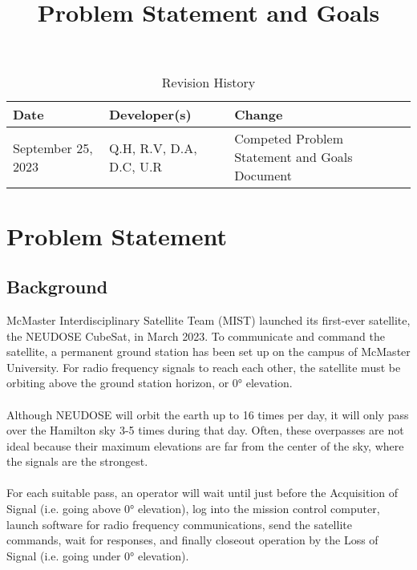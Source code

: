 \documentclass{article}
\title{Problem Statement and Goals\\\progname}
\author{\authname}
\date{}
\begin{document}
\maketitle

\begin{table}[hp]
\caption{Revision History} \label{TblRevisionHistory}
\begin{tabularx}{\textwidth}{llX}
\toprule
\textbf{Date} & \textbf{Developer(s)} & \textbf{Change}\\
\midrule
September 25, 2023 & Q.H, R.V, D.A, D.C, U.R & Competed Problem Statement and Goals Document\\
\bottomrule
\end{tabularx}
\end{table}

\section{Problem Statement}

\subsection{Background}
McMaster Interdisciplinary Satellite Team (MIST) launched its first-ever satellite, the NEUDOSE
CubeSat, in March 2023. To communicate and command the satellite, a permanent ground station has been set up on the campus of McMaster University. For radio frequency signals to reach each other, the satellite must be orbiting above the ground station horizon, or 0° elevation. 
\\ \\
Although NEUDOSE will orbit the earth up to 16 times per day, it will only pass over the Hamilton sky 3-5 times during that day. Often, these overpasses are not ideal because their maximum elevations are far from the center of the sky, where the signals are the strongest.
\\ \\ 
For each suitable pass, an operator will wait until just before the Acquisition of Signal (i.e. going above 0° elevation), log into the mission control computer, launch software for radio frequency communications, send the satellite commands, wait for responses, and finally closeout operation by the Loss of Signal (i.e. going under 0° elevation).
\end{document}
